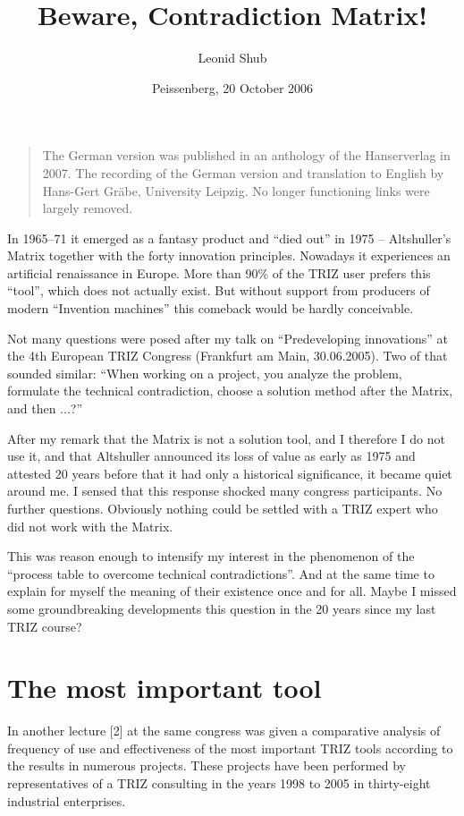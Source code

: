 \documentclass[11pt,a4paper]{article}
\title{Beware, Contradiction Matrix!}
\author{Leonid Shub}
\date{Peissenberg, 20 October 2006}
\begin{document}
\maketitle

\begin{quote}
  The German version was published in an anthology of the Hanserverlag in
  2007. The recording of the German version and translation to English by
  Hans-Gert Gräbe, University Leipzig. No longer functioning links were
  largely removed.
\end{quote}

In 1965--71 it emerged as a fantasy product and ``died out'' in 1975 --
Altshuller's Matrix together with the forty innovation principles.  Nowadays
it experiences an artificial renaissance in Europe. More than 90\% of the TRIZ
user prefers this ``tool'', which does not actually exist. But without support
from producers of modern ``Invention machines'' this comeback would be hardly
conceivable.

Not many questions were posed after my talk on ``Predeveloping innovations''
at the 4th European TRIZ Congress (Frankfurt am Main, 30.06.2005). Two of that
sounded similar: ``When working on a project, you analyze the problem,
formulate the technical contradiction, choose a solution method after the
Matrix, and then ...?''

After my remark that the Matrix is not a solution tool, and I therefore I do
not use it, and that Altshuller announced its loss of value as early as 1975
and attested 20 years before that it had only a historical significance, it
became quiet around me.  I sensed that this response shocked many congress
participants. No further questions.  Obviously nothing could be settled with a
TRIZ expert who did not work with the Matrix.

This was reason enough to intensify my interest in the phenomenon of the
``process table to overcome technical contradictions''. And at the same time
to explain for myself the meaning of their existence once and for all. Maybe I
missed some groundbreaking developments this question in the 20 years since my
last TRIZ course?

\section*{The most important tool}
In another lecture [2] at the same congress was given a comparative analysis
of frequency of use and effectiveness of the most important TRIZ tools
according to the results in numerous projects. These projects have been
performed by representatives of a TRIZ consulting in the years 1998 to 2005 in
thirty-eight industrial enterprises.
\end{document}
